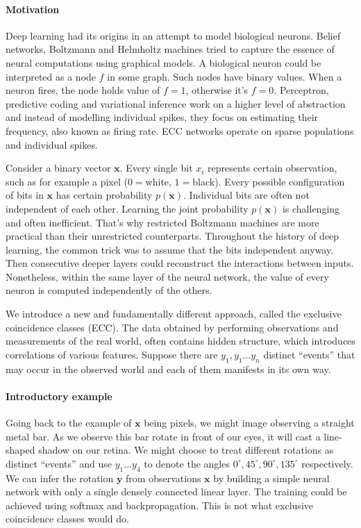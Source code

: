 \documentclass[12pt]{article}
\begin{document}
\paragraph{Motivation}
Deep learning had its origins in an attempt to model biological neurons. Belief networks, Boltzmann and Helmholtz machines tried to capture the essence of neural computations using graphical models. A biological neuron could be interpreted as a node $f$ in some graph. Such nodes have binary values. When a neuron fires, the node holds value of $f=1$, otherwise it's $f=0$. Perceptron, predictive coding and variational inference work on a higher level of abstraction and instead of modelling individual spikes, they focus on estimating their frequency, also known as firing rate. ECC networks operate on sparse populations and individual spikes.



Consider a binary vector $\boldsymbol{x}$. Every single bit $x_i$ represents certain observation, such as for example a pixel ($0=$white, $1=$black). Every possible configuration of bits in $\boldsymbol{x}$ has certain probability $p(\boldsymbol{x})$. Individual bits are often not independent of each other. Learning the joint probability $p(\boldsymbol{x})$ is challenging and often inefficient. That's why restricted Boltzmann machines are more practical than their unrestricted counterparts. Throughout the history of deep learning, the common trick was to assume that the bits independent anyway. Then consecutive deeper layers could reconstruct the interactions between inputs. Nonetheless, within the same layer of the neural network, the value of every neuron is computed independently of the others. 

We introduce a new and fundamentally different approach, called the exclusive coincidence classes (ECC). The data obtained by performing observations and measurements of the real world, often contains hidden structure, which introduces correlations of various features. Suppose there are $y_1,y_1...y_n$ distinct ``events''
that may occur in the observed world and each of them manifests in its own way.

\paragraph{Introductory example}
Going back to the example of $\boldsymbol{x}$ being pixels, we might image observing a straight metal bar. As we observe this bar rotate in front of our eyes, it will cast a line-shaped shadow on our retina. We might choose to treat different  rotations as distinct ``events'' and use $y_1...y_4$ to denote the angles $0^{\circ},45^{\circ},90^{\circ},135^{\circ}$ respectively. We can infer the rotation $\boldsymbol{y}$ from observations $\boldsymbol{x}$ by building a simple neural network with only a single densely connected linear layer. The training could be achieved using softmax and backpropagation. This is not what exclusive coincidence classes would do. 
\end{document}
